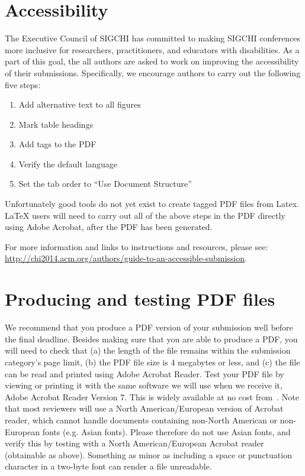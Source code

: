 \documentclass{chi-ext}
\begin{document}
\section{Accessibility}
The Executive Council of SIGCHI has committed to making SIGCHI conferences more inclusive for researchers, practitioners, and educators with disabilities. As a part of this goal, the all authors are asked to work on improving the accessibility of their submissions. Specifically, we encourage authors to carry out the following five steps:
\begin{enumerate}
	\item Add alternative text to all figures
	\item Mark table headings
	\item Add tags to the PDF
	\item Verify the default language
	\item Set the tab order to ``Use Document Structure''
\end{enumerate}
Unfortunately good tools do not yet exist to create tagged PDF files from Latex. LaTeX users will need to carry out all of the above steps in the PDF directly using Adobe Acrobat, after the PDF has been generated.
 
For more information and links to instructions and resources, please see:
{\url{http://chi2014.acm.org/authors/guide-to-an-accessible-submission}}.

\section{Producing and testing PDF files}
We recommend that you produce a PDF version of your submission well before the final deadline. 
Besides making sure that you are able to produce a PDF, you will need to check that (a) the length of the file remains within the submission category's page limit, (b) the PDF file size is 4 megabytes or less, and (c) the file can be read and printed using Adobe Acrobat Reader. 
Test your PDF file by viewing or printing it with the same software we will use when we receive it, Adobe Acrobat Reader Version 7. 
This is widely available at no cost from~\cite{Acrobat7}.  
Note that most reviewers will use a North American/European version of Acrobat reader, which cannot handle documents containing non-North American or non-European fonts (e.g. Asian fonts).  
Please therefore do not use Asian fonts, and verify this by testing with a North American/European Acrobat reader (obtainable as above). Something as minor as including a space or punctuation character in a two-byte font can render a file unreadable.
\end{document}
